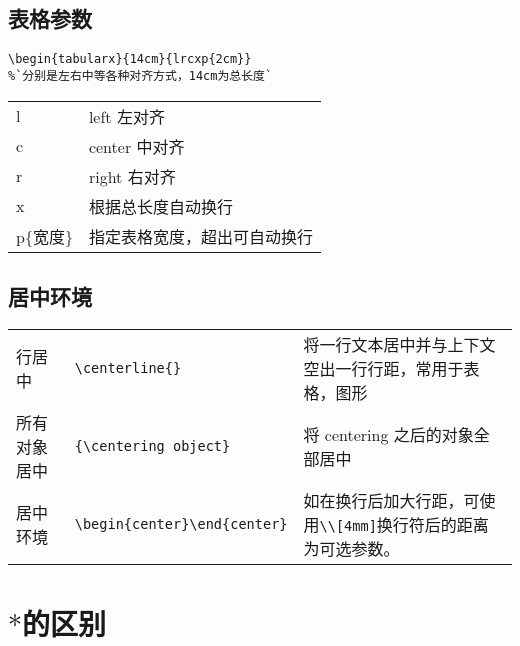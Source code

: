 \subsection{表格参数}
\begin{lstlisting}[language={[LaTeX]TeX}]
\begin{tabularx}{14cm}{lrcxp{2cm}}
%`分别是左右中等各种对齐方式，14cm为总长度`
\end{lstlisting}
\begin{tabular}{ll}


  l & left 左对齐\\
  c & center 中对齐 \\
  r & right 右对齐 \\
  x & 根据总长度自动换行\\
  p\{宽度\} & 指定表格宽度，超出可自动换行 \\

\end{tabular}

\subsection{居中环境}

\begin{tabularx}{14cm}{lp{4cm}X}
  行居中 & \verb|\centerline{}| & 将一行文本居中并与上下文空出一行行距，常用于表格，图形 \\
  所有对象居中 &  \verb|{\centering object}| & 将 centering 之后的对象全部居中\\
  居中环境 & \verb|\begin{center}|\verb|\end{center}| &如在换行后加大行距，可使用\verb|\\[4mm]|换行符后的距离为可选参数。\\
\end{tabularx}

\section{$*$的区别}

